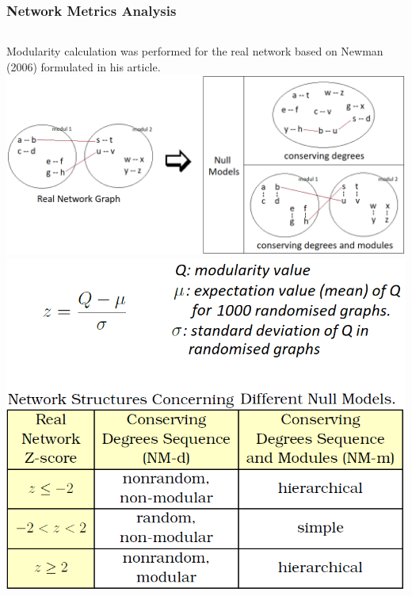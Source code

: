 \begin{frame}
	\frametitle{Network Metrics Analysis}
	\begin{columns}[c]
		Modularity calculation was performed for the real network based on Newman (2006) formulated in his article.
		\includegraphics[width=\linewidth]{../tables/cartoon-null-model-definitions.png}
		\includegraphics[width=\textwidth]{../tables/expected_network_structures_2.png}
	\end{columns}
\end{frame}